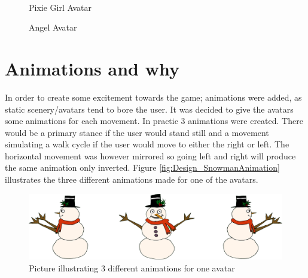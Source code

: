 \begin{figure}[htbp]
\begin{minipage}[b]{0.45\textwidth}
\end{minipage} \\ %
\begin{minipage}[t]{0.45\textwidth}
\caption{Pixie Girl Avatar} %
\label{fig:PixieGirl}
\end{minipage} \hfill
\begin{minipage}[t]{0.45\textwidth}
\caption{Angel Avatar} %
\label{fig:Angel}
\end{minipage}
\end{figure}

\section{Animations and why}
In order to create some excitement towards the game; animations were added, as static scenery/avatars tend to bore the user. It was decided to give the avatars some animations for each movement. In practic 3 animations were created. There would be a primary stance if the user would stand still and a movement simulating a walk cycle if the user would move to either the right or left. The horizontal movement was however mirrored so going left and right will produce the same animation only inverted.
Figure \eqref{fig:Design_SnowmanAnimation} illustrates the three different animations made for one of the avatars.
\begin{figure}[htbp]
\centering
\includegraphics[width=1.00\textwidth]{Pictures/Design/SnowManShowOff.png}
\caption{Picture illustrating 3 different animations for one avatar}
\label{fig:Design_SnowmanAnimation}
\end{figure} 
